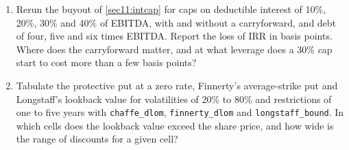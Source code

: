 \begin{chapterrefs}
\begin{enumerate}[label=\textbf{P11.\arabic*}, leftmargin=*, ref=P11.\arabic*]
\item Rerun the buyout of \cref{sec11:intcap} for caps on deductible interest of 10\%, 20\%, 30\% and 40\% of
EBITDA, with and without a carryforward, and debt of four, five and six times EBITDA. Report the loss of
IRR in basis points. Where does the carryforward matter, and at what leverage does a 30\% cap start to
cost more than a few basis points?
\item Tabulate the protective put at a zero rate, Finnerty's average-strike put and Longstaff's lookback value
for volatilities of 20\% to 80\% and restrictions of one to five years with \texttt{chaffe\_dlom},
\texttt{finnerty\_dlom} and \texttt{longstaff\_bound}. In which cells does the lookback value exceed the
share price, and how wide is the range of discounts for a given cell?
\end{enumerate}


\end{chapterrefs}

